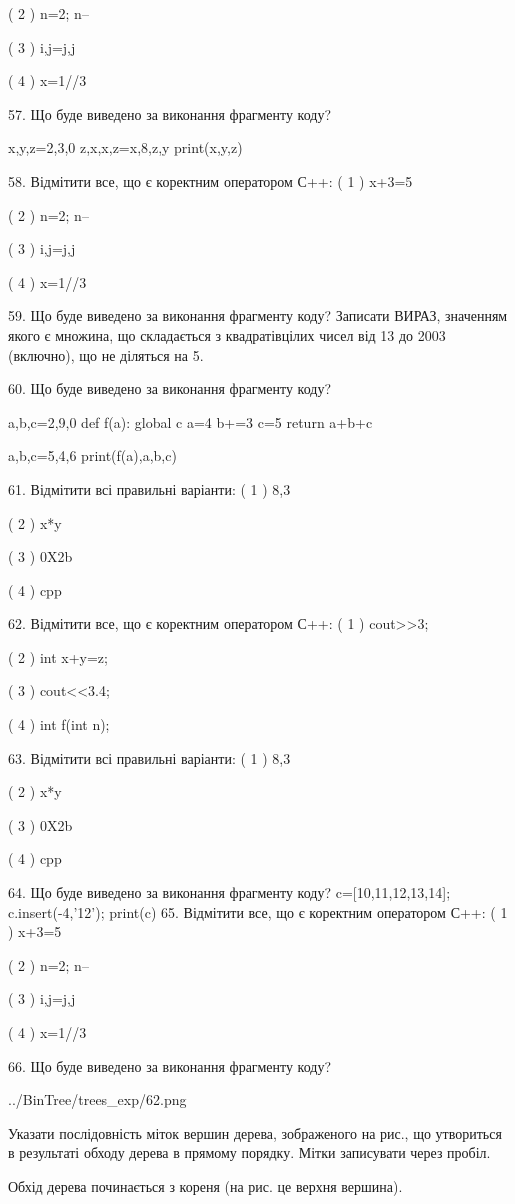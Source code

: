 \documentclass[11pt]{article}
\begin{document}
( 2 ) n=2; n--

( 3 ) i,j=j,j

( 4 ) x=1//3

57. Що буде виведено за виконання фрагменту коду?

x,y,z=2,3,0
z,x,x,z=x,8,z,y
print(x,y,z)

58. Відмітити все, що є коректним оператором С++:
( 1 ) x+3=5

( 2 ) n=2; n--

( 3 ) i,j=j,j

( 4 ) x=1//3

59. Що буде виведено за виконання фрагменту коду?
Записати ВИРАЗ, значенням якого є множина, що складається з квадратівцілих чисел від 13 до 2003 (включно), що не діляться на 5.

60. Що буде виведено за виконання фрагменту коду?

a,b,c=2,9,0
def f(a):
global c    a=4
    b+=3
    c=5
    return a+b+c

a,b,c=5,4,6
print(f(a),a,b,c)

61. Відмітити всі правильні варіанти:
( 1 ) 8,3

( 2 ) x*y

( 3 ) 0X2b

( 4 ) cpp

62. Відмітити все, що є коректним оператором С++:
( 1 ) cout>>3;

( 2 ) int x+y=z;

( 3 ) cout<<3.4;

( 4 ) int f(int n);

63. Відмітити всі правильні варіанти:
( 1 ) 8,3

( 2 ) x*y

( 3 ) 0X2b

( 4 ) cpp

64. Що буде виведено за виконання фрагменту коду?
c=[10,11,12,13,14]; c.insert(-4,'12'); print(c)
65. Відмітити все, що є коректним оператором С++:
( 1 ) x+3=5

( 2 ) n=2; n--

( 3 ) i,j=j,j

( 4 ) x=1//3

66. Що буде виведено за виконання фрагменту коду?

\begin{center}
	{../BinTree/trees_exp/62.png}
\end{center}
Указати послідовність міток вершин дерева, зображеного на рис., що утвориться в результаті обходу дерева в прямому порядку. Мітки записувати через пробіл.\par Обхід дерева починається з кореня (на рис. це верхня вершина).
\end{document}
